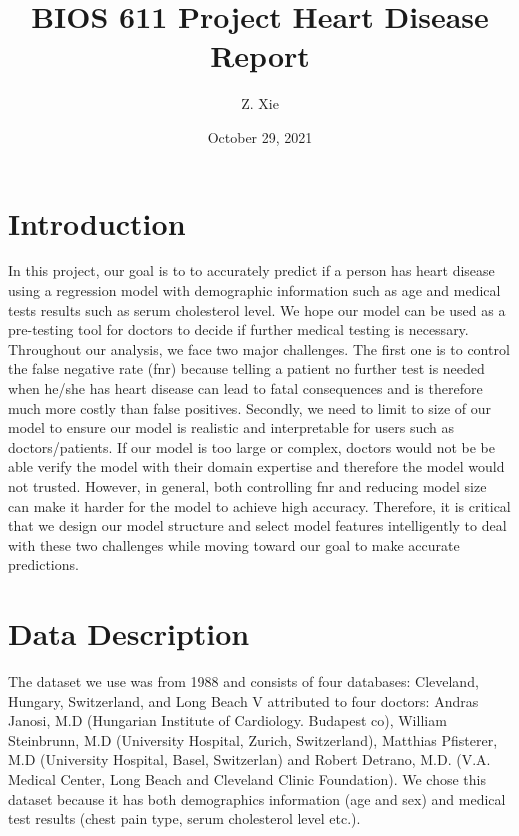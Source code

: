 \documentclass{article}
\begin{document}
\title{BIOS 611 Project Heart Disease Report}
\author{Z. Xie}
\date{October 29, 2021}
\maketitle
\section{Introduction}
In this project, our goal is to to accurately predict if a person has heart disease using a regression model with demographic information such as age and medical tests results such as serum cholesterol level. We hope our model can be used as a pre-testing tool for doctors to decide if further medical testing is necessary.\\

Throughout our analysis, we face two major challenges. The first one is to control the false negative rate (fnr) because telling a patient no further test is needed when he/she has heart disease can lead to fatal consequences and is therefore much more costly than false positives. Secondly, we need to limit to size of our model to ensure our model is realistic and interpretable for users such as doctors/patients. If our model is too large or complex, doctors would not be be able verify the model with their domain expertise and therefore the model would not trusted. However, in general, both controlling fnr and reducing model size can make it harder for the model to achieve high accuracy. Therefore, it is critical that we design our model structure and select model features intelligently to deal with these two challenges while moving toward our goal to make accurate predictions.\\

\section{Data Description}
The dataset we use was from 1988 and consists of four databases: Cleveland, Hungary, Switzerland, and Long Beach V attributed to four doctors: Andras Janosi, M.D (Hungarian Institute of Cardiology. Budapest co), William Steinbrunn, M.D (University Hospital, Zurich, Switzerland), Matthias Pfisterer, M.D (University Hospital, Basel, Switzerlan) and Robert Detrano, M.D. (V.A. Medical Center, Long Beach and Cleveland Clinic Foundation). We chose this dataset because it has both demographics information (age and sex) and medical test results (chest pain type, serum cholesterol level etc.).\\
\end{document}
